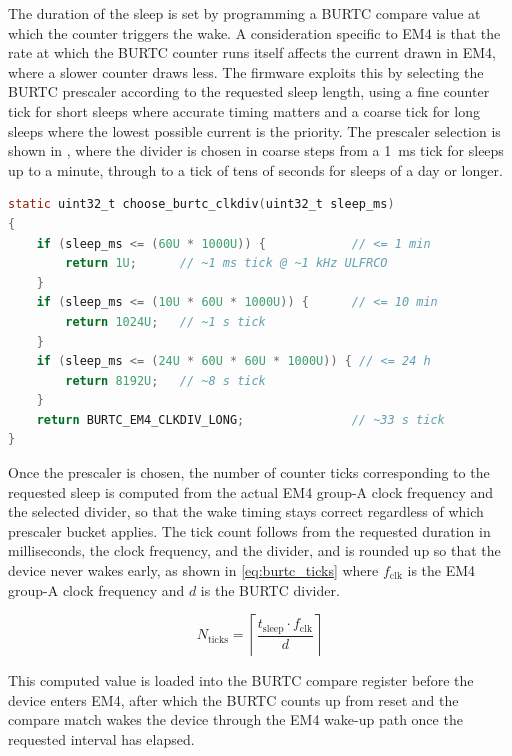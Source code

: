 The duration of the sleep is set by programming a BURTC compare value at which the counter triggers the wake.
A consideration specific to EM4 is that the rate at which the BURTC counter runs itself affects the current drawn in EM4, where a slower counter draws less.
The firmware exploits this by selecting the BURTC prescaler according to the requested sleep length, using a fine counter tick for short sleeps where accurate timing matters and a coarse tick for long sleeps where the lowest possible current is the priority.
The prescaler selection is shown in , where the divider is chosen in coarse steps from a \SI{1}{\milli\second} tick for sleeps up to a minute, through to a tick of tens of seconds for sleeps of a day or longer.

\begin{lstlisting}[language=C, caption={BURTC prescaler selection in \texttt{em4.c}, trading wake-timing granularity for lower EM4 current on longer sleeps.}, label={lst:burtc_clkdiv}]
static uint32_t choose_burtc_clkdiv(uint32_t sleep_ms)
{
    if (sleep_ms <= (60U * 1000U)) {            // <= 1 min
        return 1U;      // ~1 ms tick @ ~1 kHz ULFRCO
    }
    if (sleep_ms <= (10U * 60U * 1000U)) {      // <= 10 min
        return 1024U;   // ~1 s tick
    }
    if (sleep_ms <= (24U * 60U * 60U * 1000U)) { // <= 24 h
        return 8192U;   // ~8 s tick
    }
    return BURTC_EM4_CLKDIV_LONG;               // ~33 s tick
}
\end{lstlisting}

Once the prescaler is chosen, the number of counter ticks corresponding to the requested sleep is computed from the actual EM4 group-A clock frequency and the selected divider, so that the wake timing stays correct regardless of which prescaler bucket applies.
The tick count follows from the requested duration in milliseconds, the clock frequency, and the divider, and is rounded up so that the device never wakes early, as shown in \cref{eq:burtc_ticks} where $f_{\mathrm{clk}}$ is the EM4 group-A clock frequency and $d$ is the BURTC divider.

\begin{equation}
\label{eq:burtc_ticks}
N_{\mathrm{ticks}} = \left\lceil \frac{t_{\mathrm{sleep}} \cdot f_{\mathrm{clk}}}{d} \right\rceil
\end{equation}

This computed value is loaded into the BURTC compare register before the device enters EM4, after which the BURTC counts up from reset and the compare match wakes the device through the EM4 wake-up path once the requested interval has elapsed.